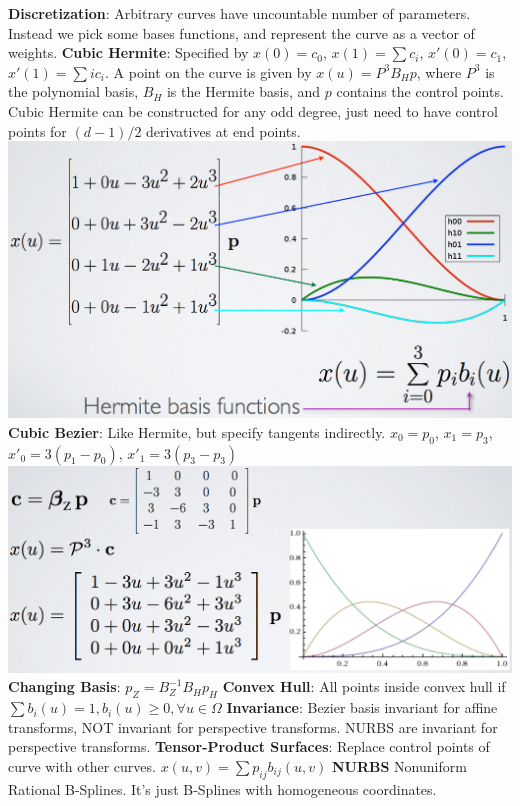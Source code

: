\documentclass[3pt,landscape]{article}
\begin{document}
\begin{multicols}{3}
{\bf Discretization}: Arbitrary curves have uncountable number of parameters. Instead we pick some bases functions, and represent the curve as a vector of weights.
{\bf Cubic Hermite}: Specified by $x(0)=c_0$, $x(1)=\sum c_i$, $x'(0)=c_1$, $x'(1)=\sum ic_i$. A point on the curve is given by $x(u)=P^3B_Hp$, where $P^3$ is the polynomial basis, $B_H$ is the Hermite basis, and $p$ contains the control points. Cubic Hermite can be constructed for any odd degree, just need to have control points for $(d-1)/2$ derivatives at end points.
\includegraphics[scale=0.22]{images/hermite}\\
{\bf Cubic Bezier}: Like Hermite, but specify tangents indirectly. $x_0=p_0$, $x_1=p_3$, $x'_0=3(p_1-p_0)$, $x'_1=3(p_3-p_3)$
\includegraphics[scale=0.20]{images/bezier}\\
{\bf Changing Basis}: $p_Z=B_Z^{-1}B_Hp_H$
{\bf Convex Hull}: All points inside convex hull if $\sum b_i(u)=1, b_i(u)\ge 0, \forall u\in \Omega$
{\bf Invariance}: Bezier basis invariant for affine transforms, NOT invariant for perspective transforms. NURBS are invariant for perspective transforms.
{\bf Tensor-Product Surfaces}: Replace control points of curve with other curves. $x(u,v)=\sum p_{ij}b_{ij}(u,v)$
{\bf NURBS} Nonuniform Rational B-Splines. It's just B-Splines with homogeneous coordinates.

\end{multicols}
\end{document}
